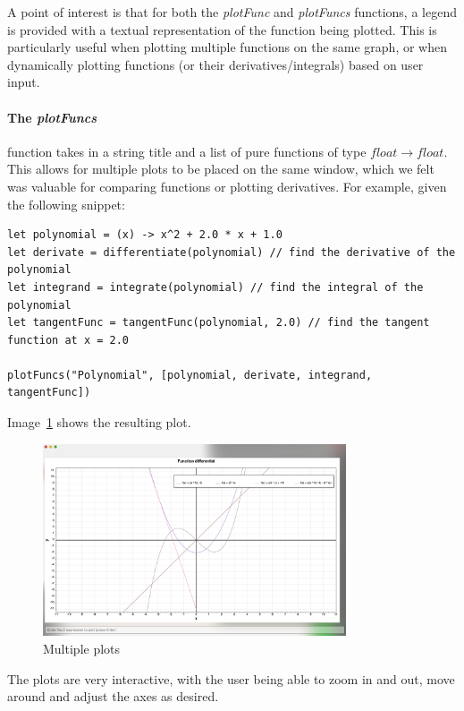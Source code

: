A point of interest is that for both the \textit{plotFunc} and \textit{plotFuncs} functions, a legend is provided 
with a textual representation of the function being plotted.
This is particularly useful when plotting multiple functions on the same graph, or when dynamically plotting 
functions (or their derivatives/integrals) based on user input.

\paragraph{The \textit{plotFuncs}} function takes in a string title and a list of pure functions of type 
\textit{$float \rightarrow float$}.
This allows for multiple plots to be placed on the same window, which we felt was valuable for comparing functions 
or plotting derivatives.
For example, given the following snippet:

\begin{verbatim}
let polynomial = (x) -> x^2 + 2.0 * x + 1.0
let derivate = differentiate(polynomial) // find the derivative of the polynomial
let integrand = integrate(polynomial) // find the integral of the polynomial
let tangentFunc = tangentFunc(polynomial, 2.0) // find the tangent function at x = 2.0

plotFuncs("Polynomial", [polynomial, derivate, integrand, tangentFunc])
\end{verbatim}

Image~\ref{fig:multiple-plots} shows the resulting plot.

\begin{figure}[H]
    \centering
    \includegraphics[width=0.8\textwidth]{assets/multiplePlots}
    \caption{Multiple plots}\label{fig:multiple-plots}
\end{figure}

The plots are very interactive, with the user being able to zoom in and out, move around and adjust the axes as
desired.

